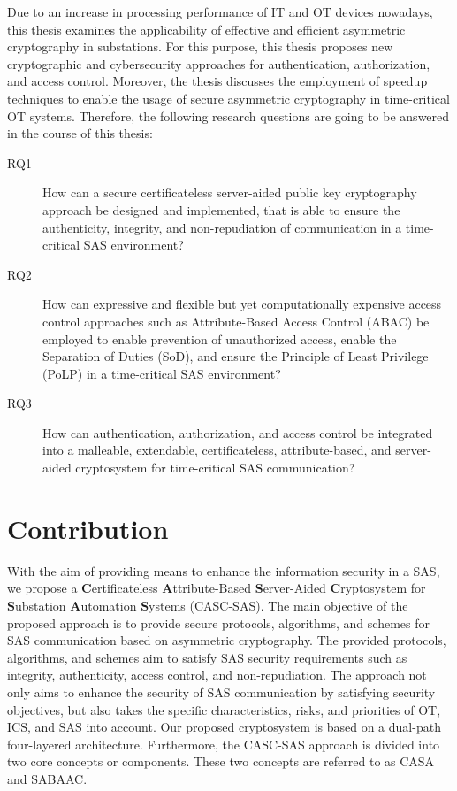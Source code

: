 Due to an increase in processing performance of IT and OT devices nowadays, this thesis examines the applicability of effective and efficient asymmetric cryptography in substations.
For this purpose, this thesis proposes new cryptographic and cybersecurity approaches for authentication, authorization, and access control.
Moreover, the thesis discusses the employment of speedup techniques to enable the usage of secure asymmetric cryptography in time-critical OT systems.
Therefore, the following research questions are going to be answered in the course of this thesis:
\begin{description}
    \item[RQ1] How can a secure certificateless server-aided public key cryptography approach be designed and implemented, that is able to ensure the authenticity, integrity, and non-repudiation of communication in a time-critical SAS environment?
    \item[RQ2] How can expressive and flexible but yet computationally expensive access control approaches such as Attribute-Based Access Control (ABAC) be employed to enable prevention of unauthorized access, enable the Separation of Duties (SoD), and ensure the Principle of Least Privilege (PoLP) in a time-critical SAS environment?
    \item[RQ3] How can authentication, authorization, and access control be integrated into a malleable, extendable, certificateless, attribute-based, and server-aided cryptosystem for time-critical SAS communication?
\end{description}

\section{Contribution}
\label{sec:introduction:contribution}
With the aim of providing means to enhance the information security in a SAS, we propose a \textbf{C}ertificateless \textbf{A}ttribute-Based \textbf{S}erver-Aided \textbf{C}ryptosystem for \textbf{S}ubstation \textbf{A}utomation \textbf{S}ystems (CASC-SAS).
The main objective of the proposed approach is to provide secure protocols, algorithms, and schemes for SAS communication based on asymmetric cryptography.
The provided protocols, algorithms, and schemes aim to satisfy SAS security requirements such as integrity, authenticity, access control, and non-repudiation.
The approach not only aims to enhance the security of SAS communication by satisfying security objectives, but also takes the specific characteristics, risks, and priorities of OT, ICS, and SAS into account.
Our proposed cryptosystem is based on a dual-path four-layered architecture.
Furthermore, the CASC-SAS approach is divided into two core concepts or components.
These two concepts are referred to as CASA and SABAAC.

